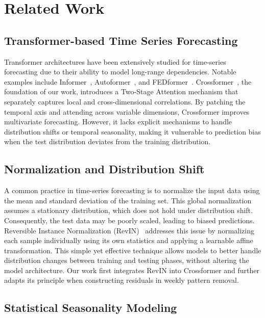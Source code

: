 \documentclass{article}
\begin{document}
\section{Related Work}

\subsection{Transformer-based Time Series Forecasting}

Transformer architectures have been extensively studied for time-series forecasting due to their ability to model long-range dependencies. Notable examples include Informer~\cite{zhou2021informer}, Autoformer~\cite{wu2021autoformer}, and FEDformer~\cite{zhou2022fedformer}. Crossformer~\cite{crossformer2023}, the foundation of our work, introduces a Two-Stage Attention mechanism that separately captures local and cross-dimensional correlations. By patching the temporal axis and attending across variable dimensions, Crossformer improves multivariate forecasting. However, it lacks explicit mechanisms to handle distribution shifts or temporal seasonality, making it vulnerable to prediction bias when the test distribution deviates from the training distribution.

\subsection{Normalization and Distribution Shift}

A common practice in time-series forecasting is to normalize the input data using the mean and standard deviation of the training set. This global normalization assumes a stationary distribution, which does not hold under distribution shift. Consequently, the test data may be poorly scaled, leading to biased predictions. Reversible Instance Normalization (RevIN)~\cite{kim2022reversible} addresses this issue by normalizing each sample individually using its own statistics and applying a learnable affine transformation. This simple yet effective technique allows models to better handle distribution changes between training and testing phases, without altering the model architecture. Our work first integrates RevIN into Crossformer and further adapts its principle when constructing residuals in weekly pattern removal.

\subsection{Statistical Seasonality Modeling}
\end{document}
